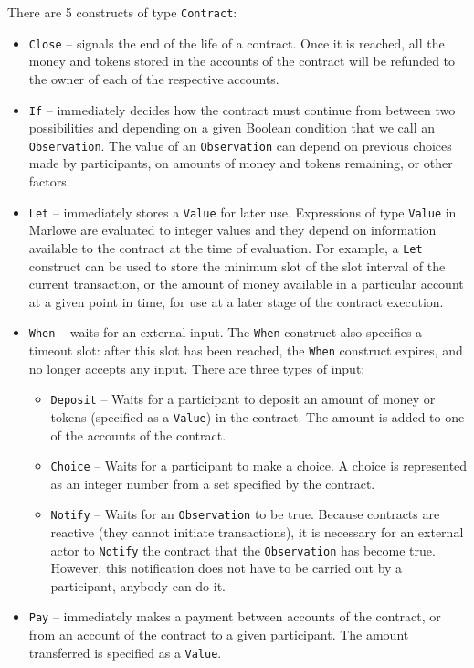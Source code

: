 \documentclass[english,runningheads]{llncs}
\begin{document}
There are 5 constructs of type \texttt{Contract}:
\begin{itemize}
\item \texttt{Close} -- signals the end of the life of a contract. Once
it is reached, all the money and tokens stored in the accounts of
the contract will be refunded to the owner of each of the respective
accounts.
\item \texttt{If} -- immediately decides how the contract must continue
from between two possibilities and depending on a given Boolean condition
that we call an \texttt{Observation}. The value of an \texttt{Observation}
can depend on previous choices made by participants, on amounts of money
and tokens remaining, or other factors.
\item \texttt{Let} -- immediately stores a \texttt{Value} for later use.
Expressions of type \texttt{Value} in Marlowe are evaluated to integer
values and they depend on information available to the contract at the
time of evaluation. For example, a \texttt{Let} construct can be used to
store the minimum slot of the slot interval of the current transaction,
or the amount of money available in a particular account at a given point
in time, for use at a later stage of the contract execution.
\item \texttt{When} -- waits for an external input. The \texttt{When} construct
also specifies a timeout slot: after this slot has been reached, the
\texttt{When} construct expires, and no longer accepts any input.
There are three types of input:
\begin{itemize}
\item \texttt{Deposit} -- Waits for a participant to deposit an amount
of money or tokens (specified as a \texttt{Value}) in the contract.
The amount is added to one of the accounts of the contract.
\item \texttt{Choice} -- Waits for a participant to make a choice. A choice
is represented as an integer number from a set specified by the contract.
\item \texttt{Notify} -- Waits for an \texttt{Observation} to be true.
Because contracts are reactive (they cannot initiate transactions),
it is necessary for an external actor to \texttt{Notify} the contract
that the \texttt{Observation} has become true. However, this notification
does not have to be carried out by a participant, anybody can do it.
\end{itemize}
\item \texttt{Pay} -- immediately makes a payment between accounts of the
contract, or from an account of the contract to a given participant.
The amount transferred is specified as a \texttt{Value}.
\end{itemize}
\end{document}
